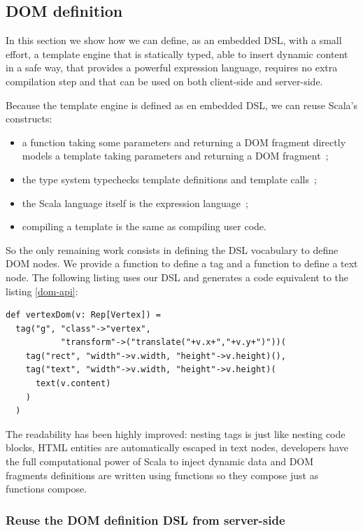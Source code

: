 \documentclass[american,english,runningheads]{llncs}
\begin{document}
\subsection{DOM definition}

In this section we show how we can define, as an embedded DSL, with a small effort, a template engine that is statically typed, able to insert dynamic content in a safe way, that provides a powerful expression language, requires no extra compilation step and that can be used on both client-side and server-side.

Because the template engine is defined as en embedded DSL, we can reuse Scala’s constructs:

\begin{itemize}
\item a function taking some parameters and returning a DOM fragment directly models a template taking parameters and returning a DOM fragment~;
\item the type system typechecks template definitions and template calls~;
\item the Scala language itself is the expression language~;
\item compiling a template is the same as compiling user code.
\end{itemize}

So the only remaining work consists in defining the DSL vocabulary to define DOM nodes. We provide a  function to define a tag and a  function to define a text node. The following listing uses our DSL and generates a code equivalent to the listing \ref{dom-api}:

\begin{lstlisting}[label=forest-hello,caption=DOM definition DSL]
def vertexDom(v: Rep[Vertex]) =
  tag("g", "class"->"vertex",
           "transform"->("translate("+v.x+","+v.y+")"))(
    tag("rect", "width"->v.width, "height"->v.height)(),
    tag("text", "width"->v.width, "height"->v.height)(
      text(v.content)
    )
  )
\end{lstlisting}

The readability has been highly improved: nesting tags is just like nesting code blocks, HTML entities are automatically escaped in text nodes, developers have the full computational power of Scala to inject dynamic data and DOM fragments definitions are written using functions so they compose just as functions compose.

\subsubsection{Reuse the DOM definition DSL from server-side}
\end{document}
